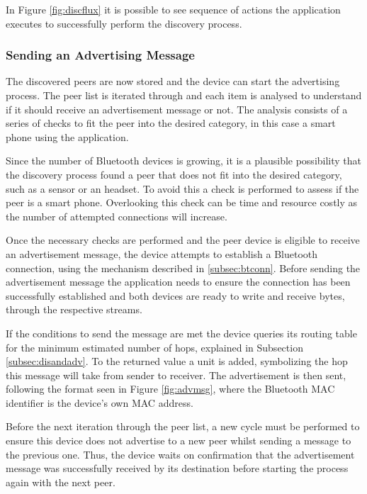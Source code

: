 In Figure \ref{fig:discflux} it is possible to see sequence of actions the application executes to successfully perform the discovery process.

\subsubsection{Sending an Advertising Message}
\label{subsubsec:sendadv}

The discovered peers are now stored and the device can start the advertising process. The peer list is iterated through and each item is analysed to understand if it should receive an advertisement message or not. The analysis consists of a series of checks to fit the peer into the desired category, in this case a smart phone using the application.

Since the number of Bluetooth devices is growing, it is a plausible possibility that the discovery process found a peer that does not fit into the desired category, such as a sensor or an headset. To avoid this a check is performed to assess if the peer is a smart phone. Overlooking this check can be time and resource costly as the number of attempted connections will increase.

Once the necessary checks are performed and the peer device is eligible to receive an advertisement message, the device attempts to establish a Bluetooth connection, using the mechanism described in \ref{subsec:btconn}. Before sending the advertisement message the application needs to ensure the connection has been successfully established and both devices are ready to write and receive bytes, through the respective streams.

If the conditions to send the message are met the device queries its routing table for the minimum estimated number of hops, explained in Subsection \ref{subsec:disandadv}. To the returned value a unit is added, symbolizing the hop this message will take from sender to receiver. The advertisement is then sent, following the format seen in Figure \ref{fig:advmsg}, where the Bluetooth \gls{MAC} identifier is the device's own \gls{MAC} address.

Before the next iteration through the peer list, a new cycle must be performed to ensure this device does not advertise to a new peer whilst sending a message to the previous one. Thus, the device waits on confirmation that the advertisement message was successfully received by its destination before starting the process again with the next peer.

